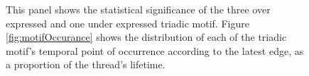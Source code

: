 \begin{figure}[!ht]
    
    
\caption{This panel shows the statistical significance of the three over expressed and one under expressed triadic motif. Figure \ref{fig:motifOccurance} shows the distribution of each of the triadic motif's temporal point of occurrence according to the latest edge, as a proportion of the thread's lifetime. }
\end{figure}